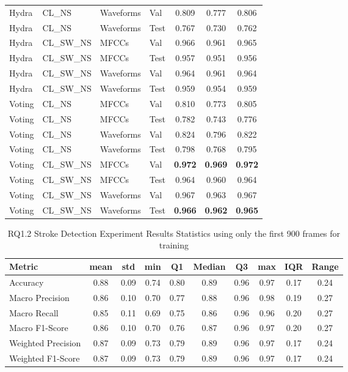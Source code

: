 \begin{longtable}{|l|l|l|l|c|c|c|}
Hydra & CL\_NS & Waveforms & Val & 0.809 & 0.777 & 0.806 \\
Hydra & CL\_NS & Waveforms & Test & 0.767 & 0.730 & 0.762 \\
Hydra & CL\_SW\_NS & MFCCs & Val & 0.966 & 0.961 & 0.965 \\
Hydra & CL\_SW\_NS & MFCCs & Test & 0.957 & 0.951 & 0.956 \\
Hydra & CL\_SW\_NS & Waveforms & Val & 0.964 & 0.961 & 0.964 \\
Hydra & CL\_SW\_NS & Waveforms & Test & 0.959 & 0.954 & 0.959 \\
Voting & CL\_NS & MFCCs & Val & 0.810 & 0.773 & 0.805 \\
Voting & CL\_NS & MFCCs & Test & 0.782 & 0.743 & 0.776 \\
Voting & CL\_NS & Waveforms & Val & 0.824 & 0.796 & 0.822 \\
Voting & CL\_NS & Waveforms & Test & 0.798 & 0.768 & 0.795 \\
Voting & CL\_SW\_NS & MFCCs & Val & \textbf{0.972} & \textbf{0.969} & \textbf{0.972} \\
Voting & CL\_SW\_NS & MFCCs & Test & 0.964 & 0.960 & 0.964 \\
Voting & CL\_SW\_NS & Waveforms & Val & 0.967 & 0.963 & 0.967 \\
Voting & CL\_SW\_NS & Waveforms & Test & \textbf{0.966} & \textbf{0.962} & \textbf{0.965} \\
\end{longtable}

\begin{table}[h]
\caption{RQ1.2 Stroke Detection Experiment Results Statistics using only the first 900 frames for training}
\label{tab:rq1.2_900_Stroke_Detection_Results_Statistics}
\begin{tabular}{|l|c|c|c|c|c|c|c|c|c|}
\toprule
Metric & mean & std & min & Q1 & Median & Q3 & max & IQR & Range \\
\midrule
Accuracy & 0.88 & 0.09 & 0.74 & 0.80 & 0.89 & 0.96 & 0.97 & 0.17 & 0.24 \\
Macro Precision & 0.86 & 0.10 & 0.70 & 0.77 & 0.88 & 0.96 & 0.98 & 0.19 & 0.27 \\
Macro Recall & 0.85 & 0.11 & 0.69 & 0.75 & 0.86 & 0.96 & 0.96 & 0.20 & 0.27 \\
Macro F1-Score & 0.86 & 0.10 & 0.70 & 0.76 & 0.87 & 0.96 & 0.97 & 0.20 & 0.27 \\
Weighted Precision & 0.87 & 0.09 & 0.73 & 0.79 & 0.89 & 0.96 & 0.97 & 0.17 & 0.24 \\
Weighted F1-Score & 0.87 & 0.09 & 0.73 & 0.79 & 0.89 & 0.96 & 0.97 & 0.17 & 0.24 \\
\bottomrule
\end{tabular}
\end{table}
